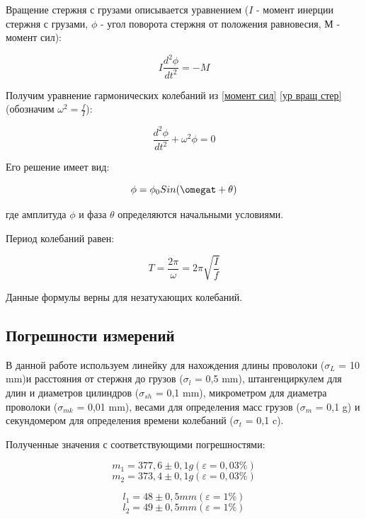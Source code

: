    Вращение стержня с грузами описывается уравнением ($I$ - момент инерции стержня с грузами, $\phi$ - угол поворота стержня от положения равновесия, М - момент сил):
   
\begin{equation} \label{ур вращ стер}
    I\frac{d^2\phi}{dt^2} = -M
\end{equation}

    Получим уравнение гармонических колебаний из \eqref{момент сил} \eqref{ур вращ стер} (обозначим $\omega^2 = \frac{f}{I}$):
    
\begin{equation}
    \frac{d^2\phi}{dt^2} + \omega^2\phi = 0
\end{equation}

    Его решение имеет вид:
    
\begin{equation}
    \phi = \phi_0 Sin(\omegat + \theta)
\end{equation}


    где амплитуда $\phi$ и фаза $\theta$ определяются начальными условиями.
    
    Период колебаний равен:
    
\begin{equation} \label{период Т}
    T = \frac{2\pi}{\omega} = 2\pi \sqrt{\frac{I}{f}}
\end{equation}

    Данные формулы верны для незатухающих колебаний.
    


\subsection{Погрешности измерений}

    В данной работе используем линейку для нахождения длины проволоки ($\sigma_L$ = 10 mm)и расстояния от стержня до грузов ($\sigma_l$ = 0,5 mm), штангенциркулем для длин и диаметров цилиндров ($\sigma_{sh}$ = 0,1 mm), микрометром для диаметра проволоки ($\sigma_{mk}$ = 0,01 mm), весами для определения масс грузов ($\sigma_m$ = 0,1 g) и секундомером для определения времени колебаний ($\sigma_t$ = 0,1 c).
    
    Полученные значения с соответствующими погрешностями:
    
\[m_1 = 377,6 \pm 0,1 g (\varepsilon = 0,03\%)\]
\[m_2 = 373,4 \pm 0,1 g (\varepsilon = 0,03\%)\]

\[l_1 = 48 \pm 0,5 mm (\varepsilon = 1\%)\]
\[l_2 = 49 \pm 0,5 mm (\varepsilon = 1\%)\]

